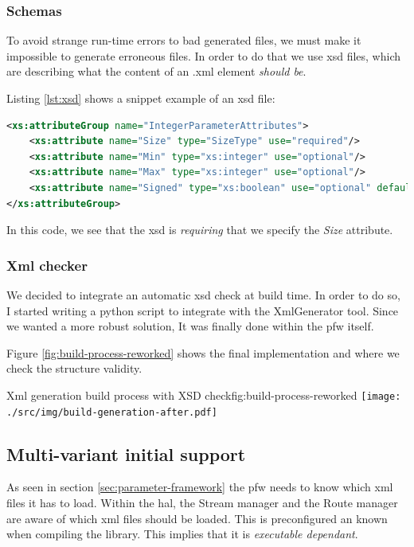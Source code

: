 \subsubsection{Schemas}
To avoid strange run-time errors to bad generated files, we must make it impossible to generate erroneous files.
In order to do that we use \gls{xsd} files, which are describing what the content of an .xml element \emph{should be}.

Listing \ref{lst:xsd} shows a snippet example of an \gls{xsd} file:

\begin{lstlisting}[language=XML, caption=XSD rules for an Integer parameter, label=lst:xsd]
<xs:attributeGroup name="IntegerParameterAttributes">
    <xs:attribute name="Size" type="SizeType" use="required"/>
    <xs:attribute name="Min" type="xs:integer" use="optional"/>
    <xs:attribute name="Max" type="xs:integer" use="optional"/>
    <xs:attribute name="Signed" type="xs:boolean" use="optional" default="false"/>
</xs:attributeGroup>
\end{lstlisting}

In this code, we see that the \gls{xsd} is \emph{requiring} that we specify the \emph{Size} attribute.

\subsubsection{Xml checker}
We decided to integrate an automatic \gls{xsd} check at build time. In order to do so, I started writing a \gls{python} script
to integrate with the XmlGenerator tool. Since we wanted a more robust solution, It was finally done within the \gls{pfw} itself.

Figure \ref{fig:build-process-reworked} shows the final implementation and where we check the structure validity.

\begin{figureGraphics}{Xml generation build process with XSD check}{fig:build-process-reworked}
    \texttt{[image: ./src/img/build-generation-after.pdf]}
\end{figureGraphics}


\subsection{Multi-variant initial support}
As seen in section \ref{sec:parameter-framework} the \gls{pfw} needs to know
which \gls{xml} files it has to load.  Within the \gls{hal}, the Stream manager
and the Route manager are aware of which \gls{xml} files should be loaded. This
is preconfigured an known when compiling the library. This implies that
it is \emph{executable dependant}.


